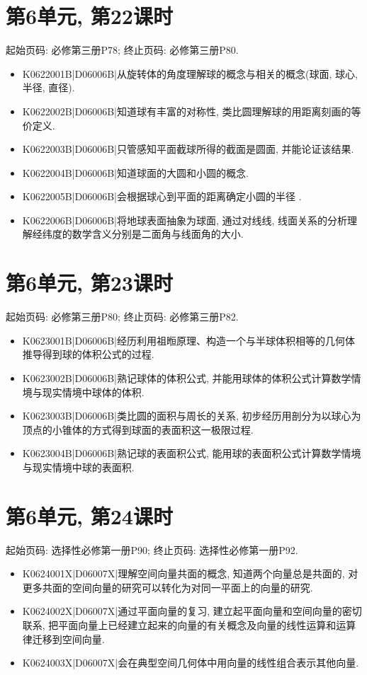 \section*{第6单元, 第22课时}
起始页码: 必修第三册P78; 终止页码: 必修第三册P80.
\begin{itemize}
\item K0622001B|D06006B|从旋转体的角度理解球的概念与相关的概念(球面, 球心, 半径, 直径).
\item K0622002B|D06006B|知道球有丰富的对称性, 类比圆理解球的用距离刻画的等价定义.
\item K0622003B|D06006B|只管感知平面截球所得的截面是圆面, 并能论证该结果.
\item K0622004B|D06006B|知道球面的大圆和小圆的概念.
\item K0622005B|D06006B|会根据球心到平面的距离确定小圆的半径 .
\item K0622006B|D06006B|将地球表面抽象为球面, 通过对线线, 线面关系的分析理解经纬度的数学含义分别是二面角与线面角的大小.
\end{itemize}

\section*{第6单元, 第23课时}
起始页码: 必修第三册P80; 终止页码: 必修第三册P82.
\begin{itemize}
\item K0623001B|D06006B|经历利用祖暅原理、构造一个与半球体积相等的几何体推导得到球的体积公式的过程.
\item K0623002B|D06006B|熟记球体的体积公式, 并能用球体的体积公式计算数学情境与现实情境中球体的体积.
\item K0623003B|D06006B|类比圆的面积与周长的关系, 初步经历用剖分为以球心为顶点的小锥体的方式得到球面的表面积这一极限过程.
\item K0623004B|D06006B|熟记球的表面积公式, 能用球的表面积公式计算数学情境与现实情境中球的表面积.
\end{itemize}

\section*{第6单元, 第24课时}
起始页码: 选择性必修第一册P90; 终止页码: 选择性必修第一册P92.
\begin{itemize}
\item K0624001X|D06007X|理解空间向量共面的概念, 知道两个向量总是共面的, 对更多共面的空间向量的研究可以转化为对同一平面上的向量的研究.
\item K0624002X|D06007X|通过平面向量的复习, 建立起平面向量和空间向量的密切联系, 把平面向量上已经建立起来的向量的有关概念及向量的线性运算和运算律迁移到空间向量.
\item K0624003X|D06007X|会在典型空间几何体中用向量的线性组合表示其他向量.
\end{itemize}

